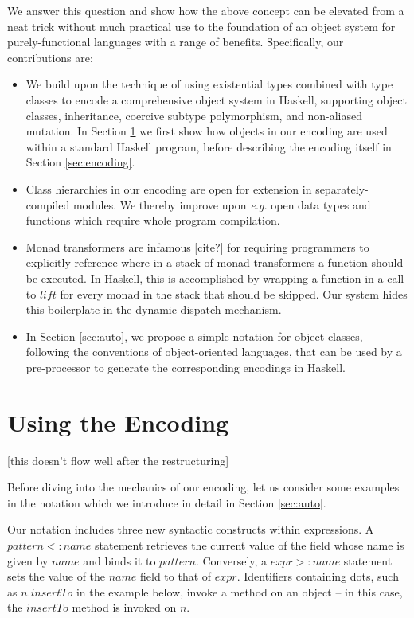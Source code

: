 \documentclass[runningheads,a4paper]{llncs}
\newcommand{\todo}[1]{[{\color{blue}#1}]}
\begin{document}
We answer this question and show how the above concept can be elevated from a neat trick without much practical use to the foundation of an object system for purely-functional languages with a range of benefits. Specifically, our contributions are:
\begin{itemize}
\item We build upon the technique of using existential types combined with type classes to encode a comprehensive object system in Haskell, supporting object classes, inheritance, coercive subtype polymorphism, and non-aliased mutation. In Section \ref{sec:usage} we first show how objects in our encoding are used within a standard Haskell program, before describing the encoding itself in Section \ref{sec:encoding}.
\item Class hierarchies in our encoding are open for extension in separately-compiled modules. We thereby improve upon \emph{e.g.} open data types and functions \cite{loh2006open} which require whole program compilation.
\item \todo{Alan: monad stacks?}Monad transformers are infamous \todo{cite?} for requiring programmers to explicitly reference where in a stack of monad transformers a function should be executed. In Haskell, this is accomplished by wrapping a function in a call to $\mathit{lift}$ for every monad in the stack that should be skipped. Our system hides this boilerplate in the dynamic dispatch mechanism. 
\item In Section \ref{sec:auto}, we propose a simple notation for object classes, following the conventions of object-oriented languages, that can be used by a pre-processor to generate the corresponding encodings in Haskell.
\end{itemize}

\section{Using the Encoding}
\label{sec:usage}

\todo{this doesn't flow well after the restructuring}

Before diving into the mechanics of our encoding, let us consider some examples in the notation which we introduce in detail in Section \ref{sec:auto}. 

Our notation includes three new syntactic constructs within expressions. A $\mathit{pattern} <: \mathit{name}$ statement retrieves the current value of the field whose name is given by $\mathit{name}$ and binds it to $\mathit{pattern}$. Conversely, a $\mathit{expr} >: \mathit{name}$ statement sets the value of the $\mathit{name}$ field to that of $\mathit{expr}$. Identifiers containing dots, such as $n.\mathit{insertTo}$ in the example below, invoke a method on an object -- in this case, the $\mathit{insertTo}$ method is invoked on $n$.
\end{document}
